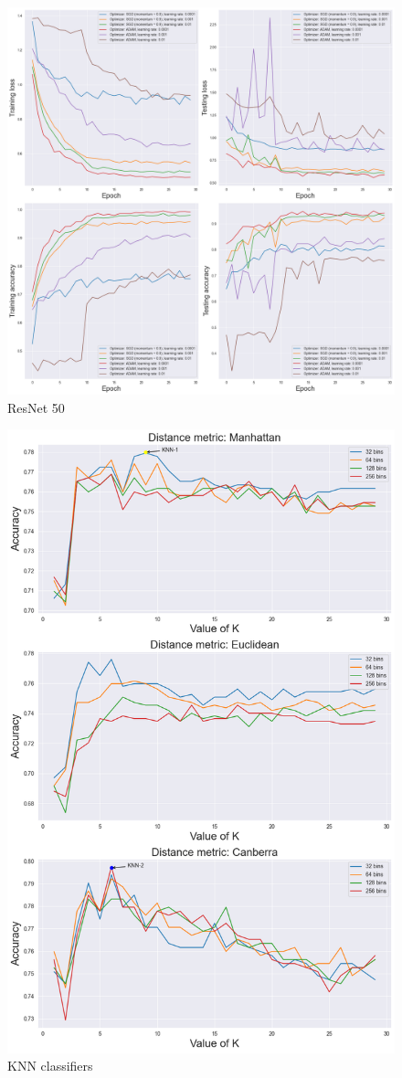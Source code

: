 \begin{figure}[!ht]
    \centering
    \includegraphics[width=\textwidth]{figures/gridsearches/resnet50}
    \caption{ResNet 50}
    \label{fig:resnet50GridSearch}
\end{figure}
\begin{figure}[!ht]
    \centering
    \includegraphics[width=\textwidth]{figures/gridsearches/knn}
    \caption{KNN classifiers}
    \label{fig:knnGridSearch}
\end{figure}


